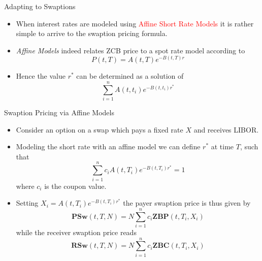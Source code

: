 \documentclass{beamer}
\begin{document}
\begin{frame}{Adapting to Swaptions}
\begin{itemize}
	\item When interest rates are modeled using \textcolor{red}{Affine Short Rate Models} it is rather simple to arrive to the swaption pricing formula.
	\item \emph{Affine Models} indeed relates ZCB price to a spot rate model according to 
	\begin{equation*}
		P(t,T) = A(t,T)e^{-B(t,T)r}
	\end{equation*} 
	\item Hence the value $r^*$ can be determined as a solution of 
	\begin{equation*}
		\sum_{i=1}^n A(t,t_i)e^{-B(t,t_i)r^*}
	\end{equation*}		
\end{itemize}
\end{frame}

\begin{frame}{Swaption Pricing via Affine Models}
\begin{itemize}
	\item Consider an option on a swap which pays a fixed rate $X$ and receives LIBOR.  
	\item Modeling the short rate with an affine model we can define $r^*$ at time $T$, such that
	\begin{equation*}
		\sum_{i=1}^n c_i A(t,T_i)e^{-B(t,T_i)r^*} = 1
	\end{equation*}
	where $c_i$ is the coupon value.
	\item Setting $X_i = A(t,T_i)e^{-B(t,T_i)r^*}$ the payer swaption price is thus given by
	\begin{equation}
		\textbf{PSw}(t,T,N) = N\sum_{i=1}^n c_i \textbf{ZBP}(t,T_i,X_i)
	\end{equation}
	while the receiver swaption price reads
	\begin{equation}
		\textbf{RSw}(t,T,N) = N\sum_{i=1}^n c_i \textbf{ZBC}(t,T_i,X_i)
	\end{equation}
\end{itemize}
\end{frame}
\end{document}
